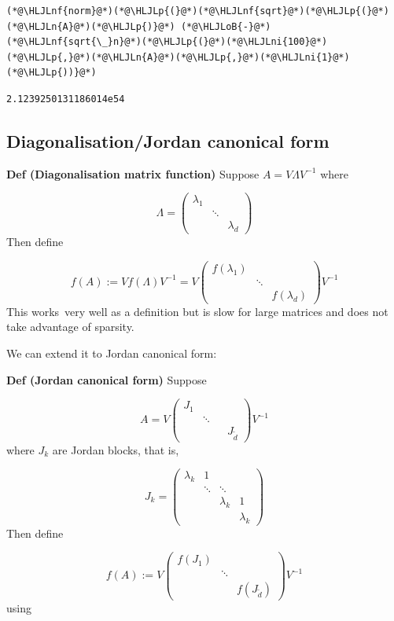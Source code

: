 \documentclass[12pt,a4paper]{article}
\newcommand{\HLJLn}[1]{#1}
\newcommand{\HLJLnf}[1]{\textcolor[RGB]{66,102,213}{#1}}
\newcommand{\HLJLni}[1]{\textcolor[RGB]{59,151,46}{#1}}
\newcommand{\HLJLoB}[1]{\textcolor[RGB]{102,102,102}{\textbf{#1}}}
\newcommand{\HLJLp}[1]{#1}
\begin{document}
\begin{lstlisting}
(*@\HLJLnf{norm}@*)(*@\HLJLp{(}@*)(*@\HLJLnf{sqrt}@*)(*@\HLJLp{(}@*)(*@\HLJLn{A}@*)(*@\HLJLp{)}@*) (*@\HLJLoB{-}@*) (*@\HLJLnf{sqrt{\_}n}@*)(*@\HLJLp{(}@*)(*@\HLJLni{100}@*)(*@\HLJLp{,}@*)(*@\HLJLn{A}@*)(*@\HLJLp{,}@*)(*@\HLJLni{1}@*)(*@\HLJLp{))}@*)
\end{lstlisting}

\begin{lstlisting}
2.1239250131186014e54
\end{lstlisting}


\subsection{Diagonalisation/Jordan canonical form}
\textbf{Def (Diagonalisation matrix function)} Suppose $A = V \Lambda V^{-1}$ where

\[
\Lambda = \begin{pmatrix} \lambda_1 \\ & \ddots \\ && \lambda_d \end{pmatrix}
\]
Then define 

\[
f(A) := V f(\Lambda) V^{-1} = V \begin{pmatrix} f(\lambda_1) \\ & \ddots \\ && f(\lambda_d) \end{pmatrix} V^{-1}
\]
This works very well as a definition but is slow for large matrices and does not take advantage of sparsity. 

We can extend it to Jordan canonical form:

\textbf{Def (Jordan canonical form)} Suppose 

\[
A = V \begin{pmatrix} J_1 \\ & \ddots & \\&&& J_{\tilde d} \end{pmatrix} V^{-1}
\]
where $J_k$ are Jordan blocks, that is, 

\[
J_k = \begin{pmatrix} \lambda_k & 1 \\ & \ddots & \ddots \\ && \lambda_k & 1 \\ &&& \lambda_k \end{pmatrix}
\]
Then define 

\[
f(A) := V \begin{pmatrix} f(J_1) \\ & \ddots \\ && f(J_{\tilde d}) \end{pmatrix} V^{-1}
\]
using 
\end{document}
